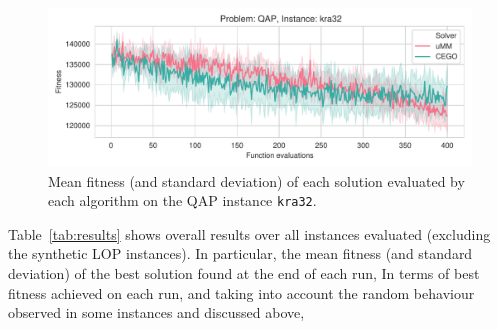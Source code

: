 \documentclass[runningheads]{llncs}
\begin{document}
\begin{figure}[tp]
  \centering%
  \includegraphics[width=\textwidth]{../img/fitness_real_qap_kra32_dat}
    \caption{Mean fitness  (and standard deviation)  of each solution evaluated by each algorithm on the QAP instance \texttt{kra32}.\label{fig:kra32}}
\end{figure}

Table~\ref{tab:results} shows overall results over all instances evaluated (excluding the synthetic LOP instances). In particular, the mean fitness (and standard deviation) of the best solution found at the end of each run,
In terms of best fitness achieved on each run, and taking into account the
random behaviour observed in some instances and discussed above,
\end{document}
